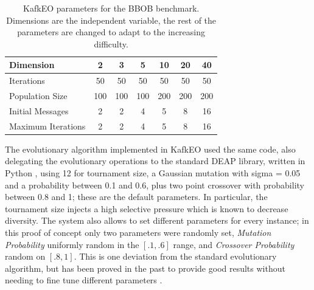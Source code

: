 \documentclass{llncs}
\begin{document}
  \begin{table}
    \small
    \caption{KafkEO parameters for the BBOB benchmark. Dimensions are 
    the independent variable, the rest of the parameters are changed to 
    adapt to the increasing difficulty. }
    \label{tab:params:kafka}
    \centering
    \small
    \begin{tabular}{|l|c|c|c|c|c|c|}
      \hline
      Dimension & 2 & 3 & 5 & 10 & 20 & 40\\ \hline
      Iterations & 50 & 50 & 50 & 50 & 50 & 50\\ \hline
      Population Size  & 100 & 100 & 100 & 200 & 200 & 200 \\ \hline
      Initial Messages & 2 & 2 & 4 & 5 & 8 & 16  \\ \hline
      Maximum Iterations & 2 & 2 & 4 & 5 & 8 & 16  \\ \hline
    \end{tabular}
  \end{table}

  The evolutionary algorithm implemented in KafkEO used the same code,
  also delegating the evolutionary operations to the standard DEAP
  library, written in
  Python \cite{fortin2012deap},
  using 12 for tournament size, a Gaussian mutation with sigma = 0.05 and a probability between 0.1 and 0.6, plus two point crossover with probability between 0.8 and 1; these are the default parameters.  
  In particular, the tournament size injects a high selective
  pressure which is known to decrease diversity. The system also allows
  to set different parameters for every instance; in this proof of concept
  only two parameters were randomly set, {\em Mutation Probability}
  uniformly random in the $[.1,.6]$ range, and {\em Crossover
    Probability} random on $[.8,1]$. This is one deviation from the
  standard evolutionary algorithm, but has been proved in the past to
  provide good results without needing to fine tune different
  parameters \cite{tanabe2013evaluation}.

\end{document}
